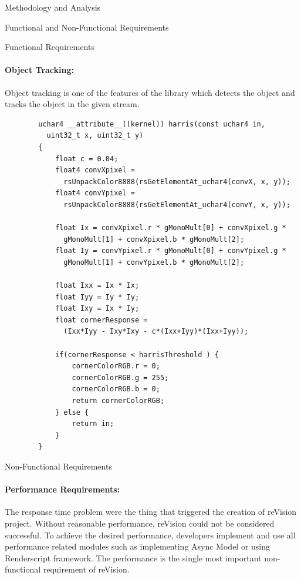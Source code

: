 \documentclass[12pt, a4paper]{article} \pagenumbering{gobble}
\begin{document}
\begin{section}{Methodology and Analysis}
\begin{subsection}{Functional and Non-Functional Requirements}
\begin{subsubsection}{Functional Requirements}
      \paragraph{Object Tracking:}{
      Object tracking is one of the features of the library which detects the object and tracks the object in the given stream.
      }
      \newline
      \vspace{1cm}
      \newline
      {\ttfamily
      \begin{lstlisting}
        uchar4 __attribute__((kernel)) harris(const uchar4 in,
          uint32_t x, uint32_t y)
        {
            float c = 0.04;
            float4 convXpixel =
              rsUnpackColor8888(rsGetElementAt_uchar4(convX, x, y));
            float4 convYpixel =
              rsUnpackColor8888(rsGetElementAt_uchar4(convY, x, y));

            float Ix = convXpixel.r * gMonoMult[0] + convXpixel.g *
              gMonoMult[1] + convXpixel.b * gMonoMult[2];
            float Iy = convYpixel.r * gMonoMult[0] + convYpixel.g *
              gMonoMult[1] + convYpixel.b * gMonoMult[2];

            float Ixx = Ix * Ix;
            float Iyy = Iy * Iy;
            float Ixy = Ix * Iy;
            float cornerResponse =
              (Ixx*Iyy - Ixy*Ixy - c*(Ixx+Iyy)*(Ixx+Iyy));

            if(cornerResponse < harrisThreshold ) {
                cornerColorRGB.r = 0;
                cornerColorRGB.g = 255;
                cornerColorRGB.b = 0;
                return cornerColorRGB;
            } else {
                return in;
            }
        }
      \end{lstlisting}
      }
    \end{subsubsection}
    \newpage
    \begin{subsubsection}{Non-Functional Requirements}
      \paragraph{Performance Requirements:}{
      The response time problem were the thing that triggered the creation of reVision project. Without reasonable
      performance, reVision could not be considered successful. To achieve the desired performance, developers implement
      and use all performance related modules such as implementing Async Model or using Renderscript framework. The
      performance is the single most important non-functional requirement of reVision.
      }
      ​

\end{subsubsection}
\end{subsection}
\end{section}
\end{document}

